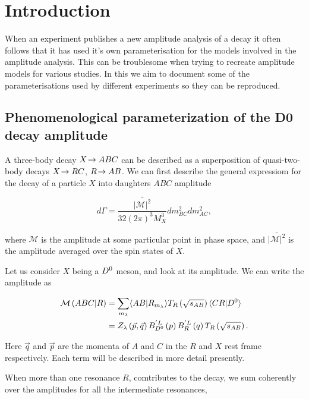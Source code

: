 \section{Introduction}
\label{sec:introduction}

When an experiment publishes a new amplitude analysis of a decay it often follows that it has used it's own parameterisation for the models involved in the amplitude analysis.
This can be troublesome when trying to recreate amplitude models for various studies. In this we aim to document some of the parameterisations used by different experiments
so they can be reproduced.

\subsection{Phenomenological parameterization of the D0 decay amplitude}

A three-body decay $X\!\rightarrow ABC$ can be described as a superposition of quasi-two-body decays $X\!\rightarrow RC$, $R\!\rightarrow AB$. 
We can first describe the general expressiom for the decay of a particle $X$ into daughters $ABC$ amplitude

\begin{equation}
    d\Gamma = \frac{\bar{|\mathcal{M}|^{2}}}{32(2\pi)^{3}M_{X}^{3}}dm_{BC}^{2}dm_{AC}^{2},
\end{equation}

where $\mathcal{M}$ is the amplitude at some particular point in phase space, and $\bar{|\mathcal{M}|^{2}}$ is the amplitude averaged over the spin states of $X$.

Let us consider $X$ being a ${{D}^0}$ meson, and look at its amplitude. We can write the amplitude as

\begin{align}
    \mathcal{M}\left( ABC | R \right) & = \sum_{m_{\lambda}}\langle AB | R_{m_{\lambda}} \rangle  T_{R}\left( \sqrt{ s_{AB} } \right) \langle CR | {{D}^0} \rangle \\
    & = Z_{\lambda}\left( \vec{p}, \vec{q} \right) B_{{{D}^0}}^{'L} \left( p \right) B_{R}^{'L} \left( q \right) T_{R} \left( \sqrt{s_{AB}} \right).
\end{align}

Here $\vec{q}$ and $\vec{p}$ are the momenta of $A$ and $C$ in the $R$ and $X$ rest frame respectively. Each term will be described in more detail presently.

When more than one resonance $R$, comtributes to the decay, we sum coherently over the amplitudes for all the intermediate resonances,


